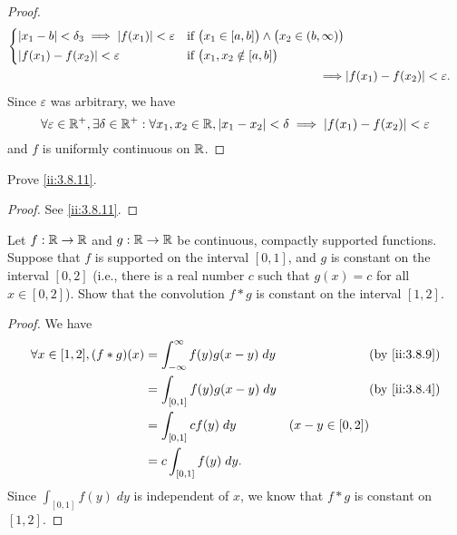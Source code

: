 \begin{proof}
\begin{align*}
\begin{dcases}
                 \abs{x_1 - b} < \delta_3 \implies \abs{f(x_1)} < \varepsilon & \text{if } \big(x_1 \in [a, b]\big) \land \big(x_2 \in (b, \infty)\big)  \\
                 \abs{f(x_1) - f(x_2)} < \varepsilon                          & \text{if } \big(x_1, x_2 \notin [a, b]\big)
               \end{dcases}            \\
    \implies & \abs{f(x_1) - f(x_2)} < \varepsilon.
  \end{align*}
  Since \(\varepsilon\) was arbitrary, we have
  \[
    \forall \varepsilon \in \mathbb{R}^+, \exists \delta \in \mathbb{R}^+ : \forall x_1, x_2 \in \mathbb{R}, \left\lvert x_1 - x_2\right\rvert < \delta \implies \left\lvert f(x_1) - f(x_2)\right\rvert < \varepsilon
  \]
  and \(f\) is uniformly continuous on \(\mathbb{R}\).
\end{proof}

\begin{ex}\label{ii:ex:3.8.4}
  Prove \cref{ii:3.8.11}.
\end{ex}

\begin{proof}
  See \cref{ii:3.8.11}.
\end{proof}

\begin{ex}\label{ii:ex:3.8.5}
  Let \(f : \mathbb{R} \to \mathbb{R}\) and \(g : \mathbb{R} \to \mathbb{R}\) be continuous, compactly supported functions.
  Suppose that \(f\) is supported on the interval \([0, 1]\), and \(g\) is constant on the interval \([0, 2]\)
  (i.e., there is a real number \(c\) such that \(g(x) = c\) for all \(x \in [0, 2]\)).
  Show that the convolution \(f * g\) is constant on the interval \([1, 2]\).
\end{ex}

\begin{proof}
  We have
  \begin{align*}
    \forall x \in [1, 2], (f * g)(x) & = \int_{-\infty}^\infty f(y) g(x - y) \; dy &                    & \by{ii:3.8.9} \\
                                     & = \int_{[0, 1]} f(y) g(x - y) \; dy         &                    & \by{ii:3.8.4} \\
                                     & = \int_{[0, 1]} c f(y) \; dy                & (x - y \in [0, 2])                 \\
                                     & = c \int_{[0, 1]} f(y) \; dy.
  \end{align*}
  Since \(\int_{[0, 1]} f(y) \; dy\) is independent of \(x\), we know that \(f * g\) is constant on \([1, 2]\).
\end{proof}

